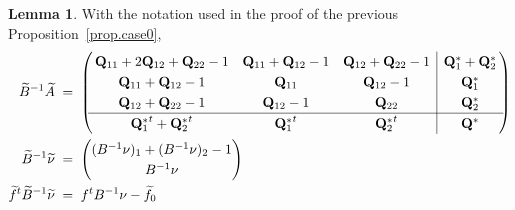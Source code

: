 \documentclass[12pt,reqno]{amsart}
\theoremstyle{definition}
\newtheorem{lemma}[theorem]{Lemma}
\def\mbfQ{\mathbf Q}
\renewcommand{\=}{\;=\;}
\begin{document}
\begin{lemma}
\label{lem.23.c0}
With the notation used in the proof of the previous Proposition~\ref{prop.case0},
\begin{align}\label{eq.c1bia}
\widetilde B^{-1}\widetilde A &\= \left(\!\!
\def\arraystretch{1.25}
\begin{array}{ccc|c}
 {\mbfQ_{11}}+2 {\mbfQ_{12}}+{\mbfQ_{22}}-1 &
 {\mbfQ_{11}}+{\mbfQ_{12}}-1 & {\mbfQ_{12}}+{\mbfQ_{22}}-1 &
 {\mbfQ_{1}^*}+{\mbfQ_{2}^*} \\
 {\mbfQ_{11}}+{\mbfQ_{12}}-1 & {\mbfQ_{11}} & {\mbfQ_{12}}-1 & {\mbfQ_{1}^*} \\
 {\mbfQ_{12}}+{\mbfQ_{22}}-1 & {\mbfQ_{12}}-1 &
 {\mbfQ_{22}} & {\mbfQ_{2}^*} \\
 \hline
 {\mbfQ_{1}^*}^t+{\mbfQ_{2}^*}^t &
 {\mbfQ_{1}^*}^t & {\mbfQ_{2}^*}^t & {\mbfQ^*} \\
\end{array}
\!\!\right)\\
\widetilde B^{-1}\widetilde{\nu}
&\=
\begin{pmatrix}
(B^{-1}\nu)_1+(B^{-1}\nu)_2-1\\
B^{-1}\nu
\end{pmatrix}\label{eq.c1biv}\\
\widetilde{f}^{t}\widetilde{B}^{-1}\widetilde{\nu}
&\=f^{t}B^{-1}\nu-\widetilde{f}_{0}\label{eq.c1ff}
\end{align}
\end{lemma}
\end{document}
